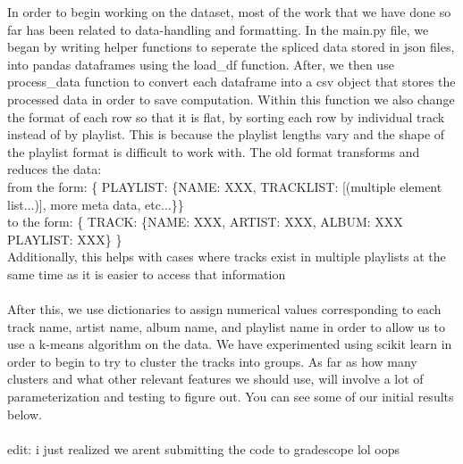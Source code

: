 \documentclass{article}
\begin{document}
In order to begin working on the dataset, most of the work that we have done so far has been related to data-handling and formatting. In the main.py file, we began by writing helper functions to seperate the
spliced data stored in json files, into pandas dataframes using the load\_df function. After, we then use process\_data function to convert each dataframe into a csv object that stores the processed data in order
to save computation. Within this function we also change the format of each row so that it is flat, by sorting each row by individual track instead of by playlist. This is because the playlist lengths vary and
the shape of the playlist format is difficult to work with. The old format transforms and reduces the data: \\
from the form: \{ PLAYLIST: \{NAME: XXX, TRACKLIST: [(multiple element list...)], more meta data, etc...\}\} \\to the form: \{ TRACK: \{NAME: XXX, ARTIST: XXX, ALBUM: XXX PLAYLIST: XXX\} \} \\
Additionally, this helps with cases where tracks exist in multiple playlists at the same time as it is easier to access that information \\ \\

After this, we use dictionaries to assign numerical values corresponding to each track name, artist name, album name, and playlist name in order to allow us to use a k-means algorithm on the data. We have experimented
using scikit learn in order to begin to try to cluster the tracks into groups. As far as how many clusters and what other relevant features we should use, will involve a lot of parameterization and testing to figure out.
You can see some of our initial results below. \\ \\

edit: i just realized we arent submitting the code to gradescope lol oops \\ \\ 
\end{document}
